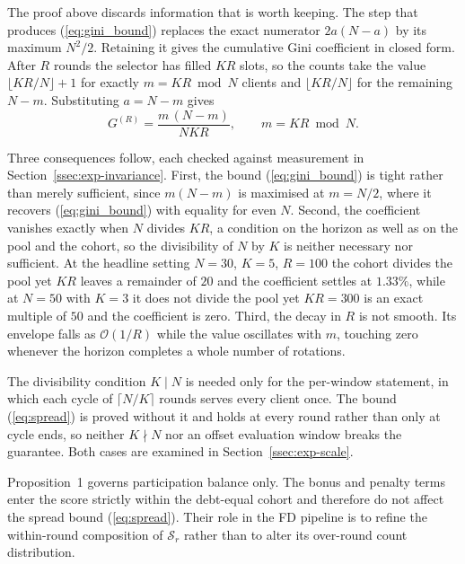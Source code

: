 \documentclass[journal]{IEEEtran}
\newcommand{\rev}[1]{#1}
\begin{document}
\rev{The proof above discards information that is worth keeping. The step that produces (\ref{eq:gini_bound}) replaces the exact numerator $2a(N-a)$ by its maximum $N^2/2$. Retaining it gives the cumulative Gini coefficient in closed form. After $R$ rounds the selector has filled $KR$ slots, so the counts take the value $\lfloor KR/N \rfloor + 1$ for exactly $m = KR \bmod N$ clients and $\lfloor KR/N \rfloor$ for the remaining $N-m$. Substituting $a = N-m$ gives}
\begin{equation}
\rev{G^{(R)} = \frac{m\,(N-m)}{N K R}, \qquad m = KR \bmod N .}
\label{eq:gini_exact}
\end{equation}

\rev{Three consequences follow, each checked against measurement in Section~\ref{ssec:exp-invariance}. First, the bound (\ref{eq:gini_bound}) is tight rather than merely sufficient, since $m(N-m)$ is maximised at $m = N/2$, where it recovers (\ref{eq:gini_bound}) with equality for even $N$. Second, the coefficient vanishes exactly when $N$ divides $KR$, a condition on the horizon as well as on the pool and the cohort, so the divisibility of $N$ by $K$ is neither necessary nor sufficient. At the headline setting $N=30$, $K=5$, $R=100$ the cohort divides the pool yet $KR$ leaves a remainder of $20$ and the coefficient settles at $1.33\%$, while at $N=50$ with $K=3$ it does not divide the pool yet $KR = 300$ is an exact multiple of $50$ and the coefficient is zero. Third, the decay in $R$ is not smooth. Its envelope falls as $\mathcal{O}(1/R)$ while the value oscillates with $m$, touching zero whenever the horizon completes a whole number of rotations.}

\rev{The divisibility condition $K \mid N$ is needed only for the per-window statement, in which each cycle of $\lceil N/K \rceil$ rounds serves every client once. The bound (\ref{eq:spread}) is proved without it and holds at every round rather than only at cycle ends, so neither $K \nmid N$ nor an offset evaluation window breaks the guarantee. Both cases are examined in Section~\ref{ssec:exp-scale}.}

Proposition~1 governs participation balance only. The bonus and penalty terms enter the score strictly within the debt-equal cohort and therefore do not affect the spread bound (\ref{eq:spread}). Their role in the FD pipeline is to refine the within-round composition of $\mathcal{S}_r$ rather than to alter its over-round count distribution. %
\end{document}

